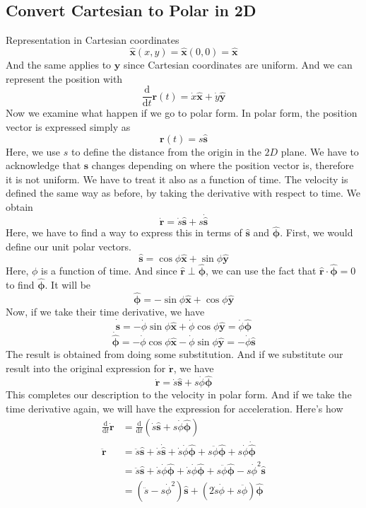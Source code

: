 \documentclass[12pt]{article}
\newcommand{\dydx}[2]{\frac{\text{d} #1}{\text{d} #2}}
\newcommand{\paren}[1]{\left( #1 \right)}
\newcommand{\unx}{\hat{\mathbf{x}}}
\newcommand{\uny}{\hat{\mathbf{y}}}
\newcommand{\uns}{\hat{\mathbf{s}}}
\newcommand{\unr}{\hat{\mathbf{r}}}
\newcommand{\unphi}{\hat{\boldsymbol\phi}}
\begin{document}
\subsection{Convert Cartesian to Polar in 2D}
Representation in Cartesian coordinates
\[
\unx(x,y)=\unx(0,0)=\unx
\]
And the same applies to $\uny$ since Cartesian coordinates are uniform. And we can represent the position with
\[
\dydx{}{t}\mathbf{r}(t) = \Dot{x}\unx+\Dot{y}\uny
\]
Now we examine what happen if we go to polar form. In polar form, the position vector is expressed simply as
\[
\mathbf{r}(t) = s\uns
\]
Here, we use $s$ to define the distance from the origin in the $2D$ plane. We have to acknowledge that $\uns$ changes depending on where the position vector is, therefore it is not uniform. We have to treat it also as a function of time. The velocity is defined the same way as before, by taking the derivative with respect to time. We obtain 
\[
\Dot{\mathbf{r}} = \Dot{s}\uns + s\Dot{\uns} 
\]
Here, we have to find a way to express this in terms of $\uns$ and $\unphi$. First, we would define our unit polar vectors.
\[
\uns = \cos\phi\unx + \sin\phi\uny
\]
Here, $\phi$ is a function of time. And since $\unr \perp \unphi$, we can use the fact that $\unr \cdot \unphi = 0$ to find $\unphi$. It will be
\[
\unphi = -\sin\phi\unx + \cos\phi\uny
\]
Now, if we take their time derivative, we have
\[
\Dot{\uns} = -\Dot{\phi}\sin\phi\unx + \Dot{\phi}\cos\phi\uny = \Dot{\phi}\unphi
\]
\[
\Dot{\unphi} = -\Dot{\phi}\cos\phi\unx - \Dot{\phi}\sin\phi\uny = - \Dot{\phi}\uns
\]
The result is obtained from doing some substitution. And if we substitute our result into the original expression for $\Dot{\mathbf{r}}$, we have
\[
\Dot{\mathbf{r}} = \Dot{s}\uns + s\Dot{\phi}\unphi
\]
This completes our description to the velocity in polar form. And if we take the time derivative again, we will have the expression for acceleration. Here's how
\begin{align*}
    \dydx{}{t}\Dot{\mathbf{r}} &= \dydx{}{t}\paren{\Dot{s}\uns + s\Dot{\phi}\unphi} \\
    \ddot{\mathbf{r}} &= \ddot{s}\uns + \dot{s}\dot{\uns} + \dot{s}\Dot{\phi}\unphi + s\ddot{\phi}\unphi + s\Dot{\phi}\dot{\unphi}\\
                      &= \ddot{s}\uns + \dot{s}\dot{\phi}\unphi + \dot{s}\dot{\phi}\unphi + s\ddot{\phi}\unphi -  s\Dot{\phi}^2\uns\\
                      &= \paren{\ddot{s}-s\dot{\phi}^2}\uns + \paren{2\dot{s}\dot{\phi}+s\ddot{\phi}}\unphi
\end{align*}
\end{document}
